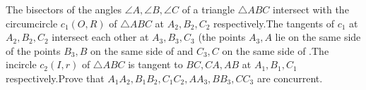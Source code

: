 The bisectors of the angles $\angle{A},\angle{B},\angle{C}$ of a triangle $\triangle{ABC}$ intersect with the circumcircle $c_1(O,R)$ of $\triangle{ABC}$ at $A_2,B_2,C_2$ respectively.The tangents of $c_1$ at $A_2,B_2,C_2$ intersect each other at $A_3,B_3,C_3$ (the points $A_3,A$ lie on the same side of the points $B_3,B$ on the same side of and $C_3,C$ on the same side of .The incircle $c_2(I,r)$ of $\triangle{ABC}$ is tangent to $BC,CA,AB$ at $A_1,B_1,C_1$ respectively.Prove that $A_1A_2,B_1B_2,C_1C_2,AA_3,BB_3,CC_3$ are concurrent.

